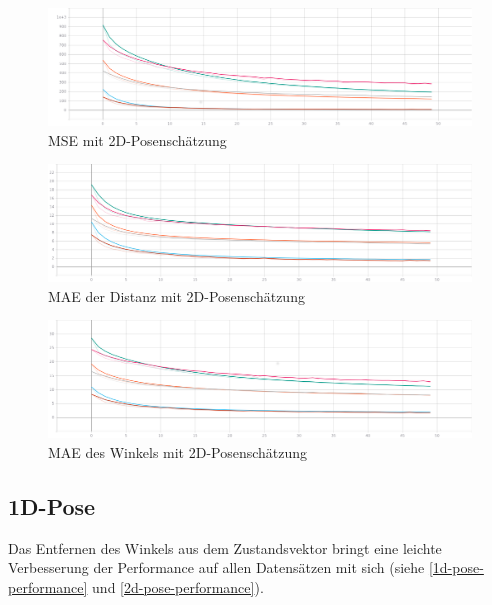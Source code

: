 \begin{figure}[H]
	\centering
	\includegraphics[width=\linewidth]{kapitel5/images//single-loss/Loss-single-loss.png}
	\caption{MSE mit 2D-Posenschätzung}
	\label{2d-poses-mse}
\end{figure}

\begin{figure}[H]
	\centering
	\includegraphics[width=\linewidth]{kapitel5/images/single-loss/Mean_Abs_Error_d-single-loss.png}
	\caption{MAE der Distanz mit 2D-Posenschätzung}
	\label{2d-poses-mae-d}
\end{figure}

\begin{figure}[H]
	\centering
	\includegraphics[width=\linewidth]{kapitel5/images/single-loss/Mean_Abs_Error_a-single-loss.png}
	\caption{MAE des Winkels mit 2D-Posenschätzung}
	\label{2d-poses-mae-a}
\end{figure}

\subsection{1D-Pose}

Das Entfernen des Winkels aus dem Zustandsvektor bringt eine leichte Verbesserung der Performance auf allen Datensätzen mit sich (siehe \ref{1d-pose-performance} und \ref{2d-pose-performance}). 

